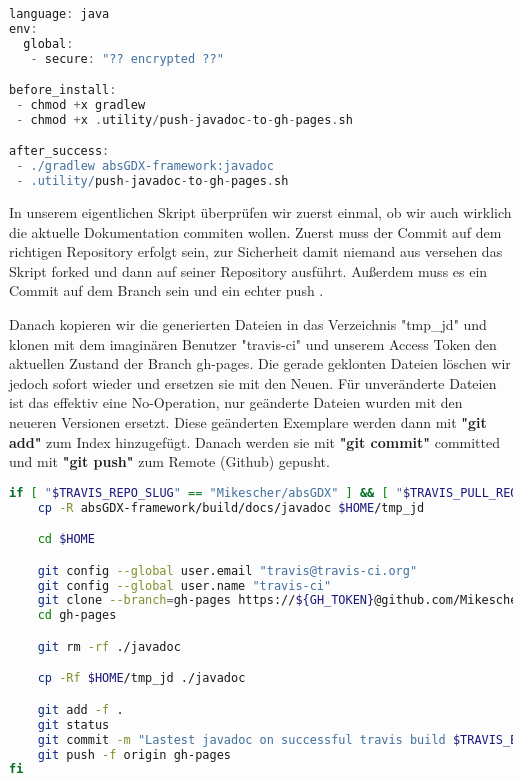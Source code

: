\doinline
\begin{lstlisting}[caption=TravisCI Konfiguration für das Erzeugen von JavaDoc, title=\hspace{0 pt}, language=groovy]
language: java
env:
  global:
   - secure: "?? encrypted ??"

before_install:
 - chmod +x gradlew
 - chmod +x .utility/push-javadoc-to-gh-pages.sh

after_success:
 - ./gradlew absGDX-framework:javadoc
 - .utility/push-javadoc-to-gh-pages.sh
\end{lstlisting}

In unserem eigentlichen Skript überprüfen wir zuerst einmal, ob wir auch wirklich die aktuelle Dokumentation commiten wollen. Zuerst muss der Commit auf dem richtigen Repository erfolgt sein, zur Sicherheit damit niemand aus versehen das Skript forked und dann auf seiner Repository ausführt. Außerdem muss es ein Commit auf dem Branch  sein und ein echter push .

Danach kopieren wir die generierten Dateien in das Verzeichnis "tmp\_jd" und klonen mit dem imaginären Benutzer "travis-ci" und unserem Access Token den aktuellen Zustand der Branch gh-pages. 
Die gerade geklonten Dateien löschen wir jedoch sofort wieder und ersetzen sie mit den Neuen. 
Für unveränderte Dateien ist das effektiv eine No-Operation, nur geänderte Dateien wurden mit den neueren Versionen ersetzt. 
Diese geänderten Exemplare werden dann mit \textbf{"git add"} zum Index hinzugefügt. 
Danach werden sie mit \textbf{"git commit"} committed und mit \textbf{"git push"} zum Remote (Github) gepusht.

\doinline
\begin{lstlisting}[caption=Das Javadoc Publish Bashscript, title=\hspace{0 pt}, language=bash]
if [ "$TRAVIS_REPO_SLUG" == "Mikescher/absGDX" ] && [ "$TRAVIS_PULL_REQUEST" == "false" ] && [ "$TRAVIS_BRANCH" == "master" ]; then
	cp -R absGDX-framework/build/docs/javadoc $HOME/tmp_jd

	cd $HOME

	git config --global user.email "travis@travis-ci.org"
	git config --global user.name "travis-ci"
	git clone --branch=gh-pages https://${GH_TOKEN}@github.com/Mikescher/absGDX gh-pages
	cd gh-pages

	git rm -rf ./javadoc

	cp -Rf $HOME/tmp_jd ./javadoc

	git add -f .
	git status
	git commit -m "Lastest javadoc on successful travis build $TRAVIS_BUILD_NUMBER auto-pushed to gh-pages"
	git push -f origin gh-pages
fi
\end{lstlisting}

